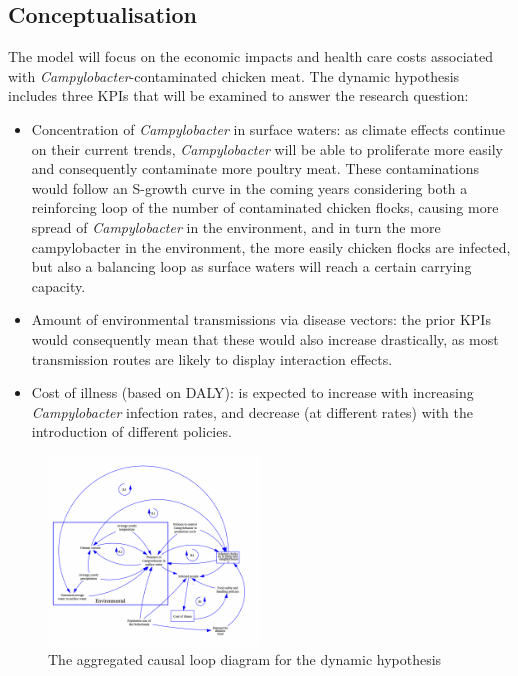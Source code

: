 \subsection{Conceptualisation}
The model will focus on the economic impacts and health care costs associated with \textit{Campylobacter}-contaminated chicken meat. The dynamic hypothesis includes three KPIs that will be examined to answer the research question: 
\begin{itemize}
    \item Concentration of \textit{Campylobacter} in surface waters: as climate effects continue on their current trends, \textit{Campylobacter} will be able to proliferate more easily and consequently contaminate more poultry meat. These contaminations would follow an S-growth curve in the coming years considering both a reinforcing loop of the number of contaminated chicken flocks, causing more spread of \textit{Campylobacter} in the environment, and in turn the more campylobacter in the environment, the more easily chicken flocks are infected, but also a balancing loop as surface waters will reach a certain carrying capacity. %
    \item Amount of environmental transmissions via disease vectors: the prior KPIs would consequently mean that these would also increase drastically, as most transmission routes are likely to display interaction effects.
    \item Cost of illness (based on DALY): is expected to increase with increasing \textit{Campylobacter} infection rates, and decrease (at different rates) with the introduction of different policies.
\end{itemize}
 
\begin{figure}[h]
\centering
\includegraphics[width=0.5\textwidth]{images/dynamic_hypo.png}
\caption{The aggregated causal loop diagram for the dynamic hypothesis}
\end{figure}
 
